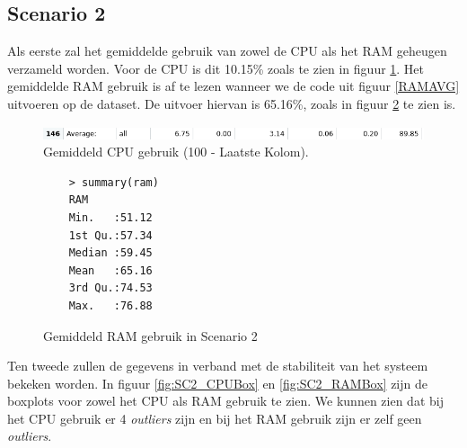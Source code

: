 
\clearpage
\subsection{Scenario 2}
Als eerste zal het gemiddelde gebruik van zowel de CPU als het RAM geheugen verzameld worden. Voor de CPU is dit 10.15\% zoals te zien in figuur \ref{fig:SC2_CPUAVG}. Het gemiddelde RAM gebruik is af te lezen wanneer we de code uit figuur \ref{RAMAVG} uitvoeren op de dataset. De uitvoer hiervan is 65.16\%, zoals in figuur \ref{SC2_RAMAVG} te zien is.
\begin{figure}[h]
	\centering
	\includegraphics[width=\linewidth]{img/SC2_CPUAVG.png}
	\caption{Gemiddeld CPU gebruik (100 - Laatste Kolom).}
	\label{fig:SC2_CPUAVG}
\end{figure}
\begin{figure}[h]
	\centering
	\begin{verbatim} 
	> summary(ram)
	RAM       
	Min.   :51.12  
	1st Qu.:57.34  
	Median :59.45  
	Mean   :65.16  
	3rd Qu.:74.53  
	Max.   :76.88  
	\end{verbatim}
	\caption{Gemiddeld RAM gebruik in Scenario 2}
	\label{SC2_RAMAVG}
\end{figure}

Ten tweede zullen de gegevens in verband met de stabiliteit van het systeem bekeken worden. In figuur \ref{fig:SC2_CPUBox} en \ref{fig:SC2_RAMBox} zijn de boxplots voor zowel het CPU als RAM gebruik te zien. We kunnen zien dat bij het CPU gebruik er 4 \textit{outliers} zijn en bij het RAM gebruik zijn er zelf geen \textit{outliers}. 

